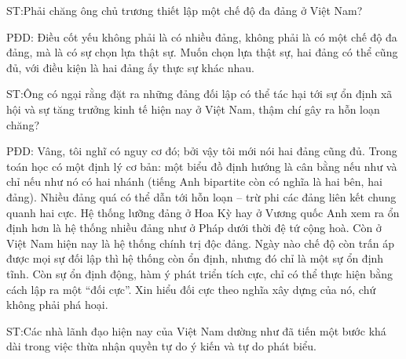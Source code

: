 ST:Phải chăng ông chủ trương thiết lập một chế độ đa đảng ở Việt Nam?

PĐD: Điều cốt yếu không phải là có nhiều đảng, không phải là có một chế độ đa đảng, mà là có sự chọn lựa thật sự. Muốn chọn lựa thật sự, hai đảng có thể cũng đủ, với điều kiện là hai đảng ấy thực sự khác nhau.

ST:Ông có ngại rằng đặt ra những đảng đối lập có thể tác hại tới sự ổn định xã hội và sự tăng trưởng kinh tế hiện nay ở Việt Nam, thậm chí gây ra hỗn loạn chăng?

PĐD: Vâng, tôi nghĩ có nguy cơ đó; bởi vậy tôi mới nói hai đảng cũng đủ. Trong toán học có một định lý cơ bản: một biểu đồ định hướng là cân bằng nếu như và chỉ nếu như nó có hai nhánh (tiếng Anh bipartite còn có nghĩa là hai bên, hai đảng). Nhiều đảng quá có thể dẫn tới hỗn loạn – trừ phi các đảng liên kết chung quanh hai cực. Hệ thống lưỡng đảng ở Hoa Kỳ hay ở Vương quốc Anh xem ra ổn định hơn là hệ thống nhiều đảng như ở Pháp dưới thời đệ tứ cộng hoà. Còn ở Việt Nam hiện nay là hệ thống chính trị độc đảng. Ngày nào chế độ còn trấn áp được mọi sự đối lập thì hệ thống còn ổn định, nhưng đó chỉ là một sự ổn định tĩnh. Còn sự ổn định động, hàm ý phát triển tích cực, chỉ có thể thực hiện bằng cách lập ra một “đối cực”. Xin hiểu đối cực theo nghĩa xây dựng của nó, chứ không phải phá hoại.

ST:Các nhà lãnh đạo hiện nay của Việt Nam dường như đã tiến một bước khá dài trong việc thừa nhận quyền tự do ý kiến và tự do phát biểu.

